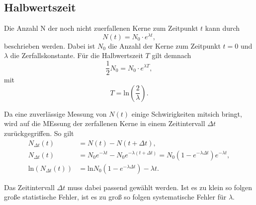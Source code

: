 \subsection{Halbwertszeit}
Die Anzahl N der noch nicht zuerfallenen Kerne zum Zeitpunkt $t$ kann durch
\begin{equation}
    N(t)=N_0\cdot e^{\lambda t},
\end{equation}
beschrieben werden. Dabei ist $N_0$ die Anzahl der Kerne zum Zeitpunkt $t=0$ und $\lambda$ 
die Zerfallskonstante. Für die Halbwertszeit $T$ gilt demnach
\begin{equation}
    \frac{1}{2}N_0=N_0\cdot e^{\lambda T},
\end{equation}
mit
\begin{equation}
    T=\text{ln}\left(\frac{2}{\lambda}\right).
\end{equation}

Da eine zuverlässige Messung von $N(t)$ einige Schwirigkeiten mitsich bringt, wird auf
die MEssung der zerfallenen Kerne in einem Zeitintervall $\Delta t$ zurückgegriffen.
So gilt
\begin{align}
    N_{\Delta t}(t)&=N(t)-N(t+\Delta t),\\
    N_{\Delta t}(t)&=N_0e^{-\lambda t}-N_0e^{-\lambda(t+\Delta t)}=N_0(1-e^{-\lambda\Delta t})e^{-\lambda t},\\
    \text{ln}(N_{\Delta t}(t))&=\text{ln}N_0(1-e^{-\lambda\Delta t})-\lambda t.
\end{align}

Das Zeitintervall $\Delta t$ muss dabei passend gewählt werden. Ist es zu klein
so folgen große statistische Fehler, ist es zu groß so folgen systematische Fehler für $\lambda$.
\label{subsec:halbwertszeit}